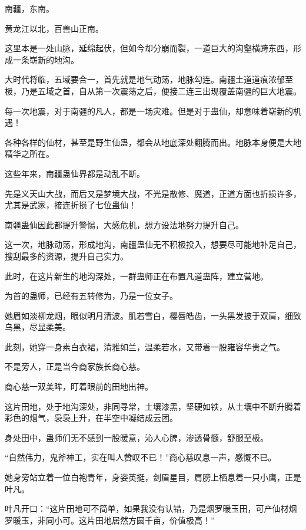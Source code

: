 
\begin{this_body}

南疆，东南。

黄龙江以北，百兽山正南。

这里本是一处山脉，延绵起伏，但如今却分崩而裂，一道巨大的沟壑横跨东西，形成一条崭新的地沟。

大时代将临，五域要合一，首先就是地气动荡，地脉勾连。南疆土道道痕浓郁至极，乃是五域之首，自从第一次震荡之后，便接二连三出现覆盖南疆的巨大地震。

每一次地震，对于南疆的凡人，都是一场灾难。但是对于蛊仙，却意味着崭新的机遇！

各种各样的仙材，甚至是野生仙蛊，都会从地底深处翻腾而出。地脉本身便是大地精华之所在。

这些年来，南疆蛊仙界都是动乱不断。

先是义天山大战，而后又是梦境大战，不光是散修、魔道，正道方面也折损许多，尤其是武家，接连折损了七位蛊仙！

南疆蛊仙因此都提升警惕，大感危机，想方设法地努力提升自己。

这一次，地脉动荡，形成地沟，南疆蛊仙无不积极投入，想要尽可能地补足自己，搜刮最多的资源，提升自己实力。

此时，在这片新生的地沟深处，一群蛊师正在布置凡道蛊阵，建立营地。

为首的蛊师，已经有五转修为，乃是一位女子。

她眉如淡柳龙烟，眼似明月清波。肌若雪白，樱唇皓齿，一头黑发披于双肩，细致乌黑，尽显柔美。

此刻，她穿一身素白衣裙，清雅如兰，温柔若水，又带着一股雍容华贵之气。

不是旁人，正是当今商家族长商心慈。

商心慈一双美眸，盯着眼前的田地出神。

这片田地，处于地沟深处，非同寻常，土壤漆黑，坚硬如铁，从土壤中不断升腾着彩色的烟气，袅袅上升，在半空中凝结成云团。

身处田中，蛊师们无不感到一股暖意，沁人心脾，渗透骨髓，舒服至极。

“自然伟力，鬼斧神工，实在叫人赞叹不已！”商心慈叹息一声，感慨不已。

她身旁站立着一位白袍青年，身姿英挺，剑眉星目，肩膀上栖息着一只小鹰，正是叶凡。

叶凡开口：“这片田地可不简单，如果我没有认错，乃是烟罗暖玉田，可产仙材烟罗暖玉，非同小可。这片田地居然方圆千亩，价值极高！”


\end{this_body}
